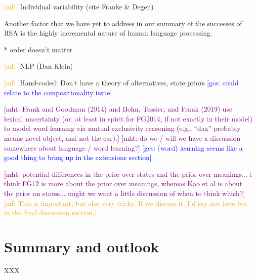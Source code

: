 \documentclass{sp}
\newcommand{\gcs}[1]{\textcolor{blue}{[gcs: #1]}}
\newcommand{\mf}[1]{\textcolor{orange}{[mf: #1]}}
\newcommand{\mht}[1]{\textcolor{purple}{[mht: #1]}}
\begin{document}
\mf{}Individual variability (cite Franke \& Degen)



Another factor that we have yet to address in our summary of the successes of RSA is the highly incremental nature of human language processing.





* order doesn't matter


\mf{}NLP (Dan Klein)





\mf{}Hand-coded: Don't have a theory of alternatives, state priors \gcs{could relate to the compositionality issue}


\mht{Frank and Goodman (2014) and Bohn, Tessler, and Frank (2019) use lexical uncertainty (or, at least in spirit for FG2014, if not exactly in their model) to model word learning via mutual-exclusivity reasoning (e.g., ``dax'' probably means novel object, and not the car).} \mht{do we / will we have a discussion somewhere about language / word learning?} \gcs{(word) learning seems like a good thing to bring up in the extensions section}

\mht{potential differences in the prior over states and the prior over meanings... i think FG12 is more about the prior over meanings, whereas Kao et al is about the prior on states... might we want a little discussion of when to think which?} \mf{This is important, but also very tricky. If we discuss it, I'd say not here but in the final discussion section.}

\section{Summary and outlook} \label{summary}

XXX




\end{document}
